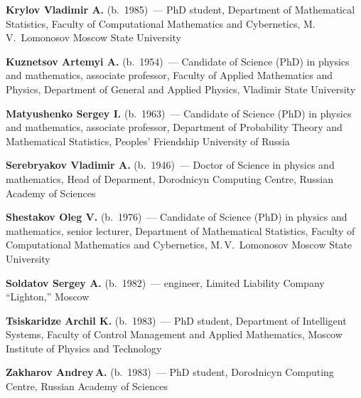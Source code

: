 \begin{multicols}{2}
\noindent
\textbf{Krylov Vladimir A.} (b.\ 1985)~--- PhD student, Department of Mathematical Statistics, 
Faculty of Computational Mathematics and Cybernetics, M.\,V.~Lomonosov Moscow State Univer\-sity

\vspace*{2pt}

\noindent
\textbf{Kuznetsov Artemyi A.} (b.\ 1954)~--- Candidate of Science (PhD) in physics and mathematics, 
associate professor, Faculty of Applied Mathematics and Physics, 
Department of  General and Applied Physics, Vladimir State University
\columnbreak


\noindent
\textbf{Matyushenko Sergey I.} (b.\ 1963)~--- Candidate of Science (PhD) in physics and mathematics, 
associate professor, 
Department of Probability Theory and 
Mathematical Statistics, Peoples' Friendship University of Russia

\vspace*{7pt}

\noindent
\textbf{Serebryakov Vladimir A.} (b.\ 1946)~--- Doctor of  Science in physics and
mathematics, Head of Deparment, Dorodnicyn Computing Centre, Russian Academy of Sciences

\vspace*{7pt}

\noindent
\textbf{Shestakov Oleg V.} (b.\ 1976)~--- Candidate of Science (PhD) in physics and mathematics, senior lecturer,
Department of Mathematical Statistics, 
Faculty of Computational Mathematics and Cybernetics, M.\,V.~Lomonosov Moscow State University

\vspace*{7pt}

\noindent
\textbf{Soldatov Sergey A.} (b.\ 1982)~--- engineer, Limited Liability Company
``Lighton,'' Moscow

\vspace*{7pt}

\noindent
\textbf{Tsiskaridze Archil K.} (b.\ 1983)~--- PhD student, Department of Intelligent
Systems, Faculty of Control Management and Applied Mathematics, Moscow
Institute of Physics and Technology

\vspace*{7pt}

\noindent
\textbf{Zakharov Andrey\,A.} (b.\ 1983)~--- PhD student, Dorodnicyn Computing Centre, Russian Academy of Sciences

\vspace*{7pt}


\end{multicols}
